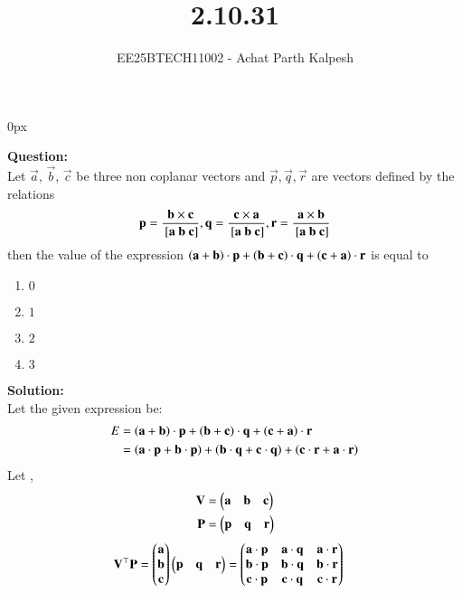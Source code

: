 \documentclass[journal]{IEEEtran}
\begin{document}

\title{2.10.31}
\author{EE25BTECH11002 - Achat Parth Kalpesh }
{\let\newpage\relax\maketitle}
\renewcommand{\thefigure}{\theenumi}
\renewcommand{\thetable}{\theenumi}
\setlength{\intextsep}{10pt} %
\renewcommand{\thetable}{\theenumi}
\parindent 0px


\textbf{Question:}\\
Let $\vec{a}$, $\vec{b}$, $\vec{c}$ be three non coplanar vectors and 
$\vec{p}, \vec{q},\vec{r}$ are vectors defined by the relations 
\begin{align}
\vec{p}=\frac{\vec{b}\times\vec{c}}{\sbrak{\vec{a}\ \vec{b}\ \vec{c}}}, \vec{q}=\frac{\vec{c}\times\vec{a}}{\sbrak{\vec{a}\ \vec{b}\ \vec{c}}},\vec{r}=\frac{\vec{a}\times\vec{b}}{\sbrak{\vec{a}\ \vec{b}\ \vec{c}}}
\end{align}
then the value of the expression $\left(\mathbf{a}+\mathbf{b}\right)\cdot\mathbf{p}+\left(\mathbf{b}+\mathbf{c}\right)\cdot\mathbf{q}+\left(\mathbf{c}+\mathbf{a}\right)\cdot\mathbf{r}$ is equal to
  \begin{multicols}{4}
\begin{enumerate}
\item $0$
\item $1$
\item $2$
\item $3$
\end{enumerate}
  \end{multicols}
\textbf{Solution:}\\
Let the given expression be:
\begin{align}
    E &= \left(\mathbf{a} + \mathbf{b}\right) \cdot \mathbf{p} + \left(\mathbf{b} + \mathbf{c}\right) \cdot \mathbf{q} + \left(\mathbf{c} + \mathbf{a}\right) \cdot \mathbf{r}\\
    &= \left(\mathbf{a} \cdot \mathbf{p} + \mathbf{b} \cdot \mathbf{p}\right) + \left(\mathbf{b} \cdot \mathbf{q} + \mathbf{c} \cdot \mathbf{q}\right) + \left(\mathbf{c} \cdot \mathbf{r} + \mathbf{a} \cdot \mathbf{r}\right)
\end{align}
Let ,
\begin{align}
    \mathbf{V} &= \begin{pmatrix}\mathbf{a}&\mathbf{b}&\mathbf{c}\end{pmatrix}\\
    \mathbf{P} &= \begin{pmatrix}\mathbf{p}&\mathbf{q}&\mathbf{r}\end{pmatrix}
\end{align}
\begin{align}
    \mathbf{V}^\top\mathbf{P} &= \begin{pmatrix}\mathbf{a}\\ \mathbf{b}\\ \mathbf{c}\end{pmatrix} \begin{pmatrix}\mathbf{p}&\mathbf{q}&\mathbf{r}\end{pmatrix} 
    = \begin{pmatrix}\mathbf{a} \cdot \mathbf{p} & \mathbf{a} \cdot \mathbf{q} & \mathbf{a} \cdot \mathbf{r} \\
        \mathbf{b} \cdot \mathbf{p} & \mathbf{b} \cdot \mathbf{q} & \mathbf{b} \cdot \mathbf{r} \\
        \mathbf{c} \cdot \mathbf{p} & \mathbf{c} \cdot \mathbf{q} & \mathbf{c} \cdot \mathbf{r}\end{pmatrix}
\end{align}
\end{document}
